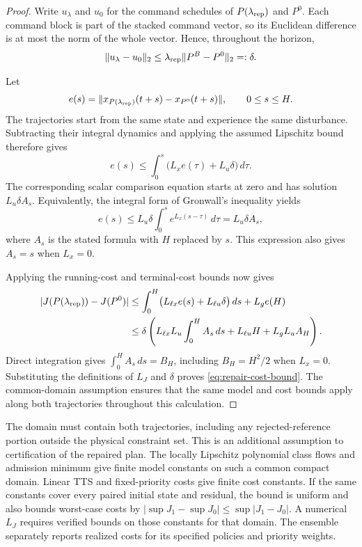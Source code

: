 \documentclass[preprint,12pt]{elsarticle}
\begin{document}
\begin{proof}
Write $u_\lambda$ and $u_0$ for the command schedules of
$P(\lambda_{\rm rep})$ and $P^0$. Each command block is part of the
stacked command vector, so its Euclidean difference is at most the norm
of the whole vector. Hence, throughout the horizon,
\[
 \|u_\lambda-u_0\|_2
 \le\lambda_{\rm rep}\|P^B-P^0\|_2=:\delta.
\]

Let
\[
 e(s)=\|x_{P(\lambda_{\rm rep})}(t+s)-x_{P^0}(t+s)\|,
 \qquad 0\le s\le H.
\]
The trajectories start from the same state and experience the same
disturbance. Subtracting their integral dynamics and applying the assumed
Lipschitz bound therefore gives
\[
 e(s)\le\int_0^s\bigl(L_xe(\tau)+L_u\delta\bigr)\,d\tau.
\]
The corresponding scalar comparison equation starts at zero and has
solution $L_u\delta A_s$. Equivalently, the integral form of Gronwall's
inequality yields
\[
 e(s)\le L_u\delta\int_0^s e^{L_x(s-\tau)}\,d\tau
       =L_u\delta A_s,
\]
where $A_s$ is the stated formula with $H$ replaced by $s$. This expression
also gives $A_s=s$ when $L_x=0$.

Applying the running-cost and terminal-cost bounds now gives
\[
\begin{aligned}
 |J(P(\lambda_{\rm rep}))-J(P^0)|
 &\le\int_0^H
       \bigl(L_{\ell x}e(s)+L_{\ell u}\delta\bigr)\,ds
       +L_g e(H)\\
 &\le\delta\left(
       L_{\ell x}L_u\int_0^H A_s\,ds
       +L_{\ell u}H+L_gL_uA_H\right).
\end{aligned}
\]
Direct integration gives $\int_0^H A_s\,ds=B_H$, including
$B_H=H^2/2$ when $L_x=0$. Substituting the definitions of $L_J$ and
$\delta$ proves \eqref{eq:repair-cost-bound}. The common-domain assumption
ensures that the same model and cost bounds apply along both trajectories
throughout this calculation.
\end{proof}

The domain must contain both trajectories, including any rejected-reference
portion outside the physical constraint set. This is an additional
assumption to certification of the repaired plan. The locally Lipschitz
polynomial class flows and admission minimum give finite model constants
on such a common compact domain. Linear TTS and fixed-priority costs give
finite cost constants. If the same constants cover every paired initial
state and residual, the bound is uniform and also bounds worst-case costs
by $|\sup J_1-\sup J_0|\le\sup|J_1-J_0|$. A numerical $L_J$ requires
verified bounds on those constants for that domain. The ensemble separately
reports realized costs for its specified policies and priority weights.
\end{document}

